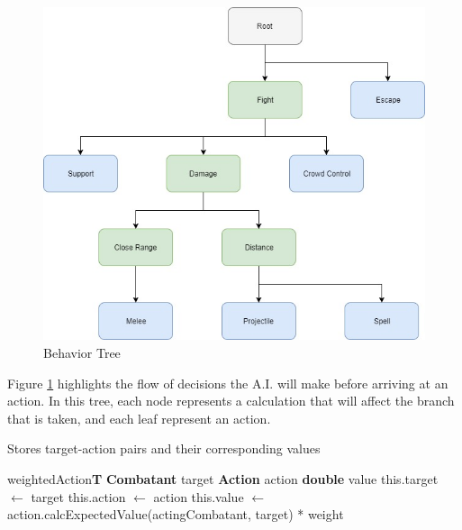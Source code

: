 \documentclass[12pt,a4paper]{report}
\begin{document}
		\begin{figure}[H]
			\centering
			\includegraphics[scale=.6]{behaviorTree}
			\caption{Behavior Tree}
			\label{fig: Behavior Tree}
		\end{figure}
		
		Figure \ref{fig: Behavior Tree} highlights the flow of decisions the A.I. will make before arriving at an action. In this tree, each node represents a calculation that will affect the branch that is taken, and each leaf represent an action. 
		
		\begin{algorithm}
			\caption{Stores target-action pairs and their corresponding values}
			\label{table:Weighted Actions}
			\begin{algorithmic}[1]
				\Class \textmd{weightedAction}\textbf{T}
					\State \textbf{Combatant} target
					\State \textbf{Action} action
					\State \textbf{double} value
					\State
						\State this.target $\gets$ target
						\State this.action $\gets$ action
						\State this.value $\gets$ action.calcExpectedValue(actingCombatant, target) * weight
					\EndFunction
				\EndClass
			\end{algorithmic}
		\end{algorithm}
		
\end{document}
